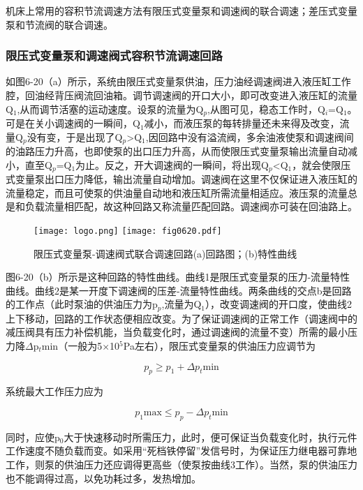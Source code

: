 机床上常用的容积节流调速方法有限压式变量泵和调速阀的联合调速；差压式变量泵和节流阀的联合调速。

\subsubsection{限压式变量泵和调速阀式容积节流调速回路}

如图6-20（a）所示，系统由限压式变量泵供油，压力油经调速阀进入液压缸工作腔，回油经背压阀流回油箱。调节调速阀的开口大小，即可改变进入液压缸的流量Q$_1$,从而调节活塞的运动速度。设泵的流量为Q$_p$,从图可见，稳态工作时，Q$_i$=Q$_1$。可是在关小调速阀的一瞬间，Q$_1$减小，而液压泵的每转排量还未来得及改变，流量Q$_p$没有变，于是出现了Q$_p$>Q$_1$,因回路中没有溢流阀，多余油液使泵和调速阀间的油路压力升高，也即使泵的出口压力升高，从而使限压式变量泵输出流量自动减小，直至Q$_p$=Q$_1$为止。反之，开大调速阀的一瞬间，将出现Q$_p$<Q$_1$，就会使限压式变量泵出口压力降低，输出流量自动增加。调速阀在这里不仅保证进入液压缸的流量稳定，而且可使泵的供油量自动地和液压缸所需流量相适应。液压泵的流量总是和负载流量相匹配，故这种回路又称流量匹配回路。调速阀亦可装在回油路上。

\begin{figure}
  \centering
  \ifOpenSource
  \texttt{[image: logo.png]}
  \else
  \texttt{[image: fig0620.pdf]}%
  \fi
  \caption{限压式变量泵-调速阀式联合调速回路(a)回路图；(b)特性曲线}
  \label{fig:fig0620}%
  \end{figure}

图6-20（b）所示是这种回路的特性曲线。曲线1是限压式变量泵的压力-流量特性曲线。曲线2是某一开度下调速阀的压差-流量特性曲线。两条曲线的交点b是回路的工作点（此时泵油的供油压力为p$_p$,流量为Q$_1$），改变调速阀的开口度，使曲线2上下移动，回路的工作状态便相应改变。为了保证调速阀的正常工作（调速阀中的减压阀具有压力补偿机能，当负载变化时，通过调速阀的流量不变）所需的最小压力降$\Delta$p$_t$$\text{min}$（一般为5$\times$10$^5$Pa左右），限压式变量泵的供油压力应调节为

\begin{equation}
  p_p\geq p_1+\Delta p_t \text{min}
\end{equation}

\noindent 系统最大工作压力应为

\begin{equation}
  p_1 \text{max} \leq p_p-\Delta p_t \text{min}
\end{equation}

\noindent 同时，应使p$_0$大于快速移动时所需压力，此时，便可保证当负载变化时，执行元件工作速度不随负载而变。如采用“死档铁停留”发信号时，为保证压力继电器可靠地工作，则泵的供油压力还应调得更高些（使泵按曲线3工作）。当然，泵的供油压力也不能调得过高，以免功耗过多，发热增加。


